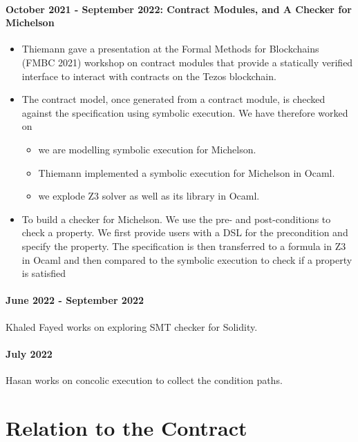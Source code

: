 \documentclass[a4paper,11pt]{article}
\begin{document}
\paragraph{October 2021 - September 2022: Contract Modules, and A Checker for Michelson}
\begin{itemize}
\item Thiemann gave a presentation at the Formal Methods for Blockchains (FMBC 2021) workshop on contract modules that provide a statically verified interface to interact with contracts on the Tezos blockchain.
\item The contract model, once generated from a contract module, is checked against the specification using symbolic execution. We have therefore worked on

\begin{itemize}
\item we are modelling symbolic execution for Michelson.
\item Thiemann implemented a symbolic execution for Michelson in Ocaml.
\item we explode Z3 solver as well as its library in Ocaml.
\end{itemize}

\item To build a checker for Michelson. We use the pre- and post-conditions to check a property. We first provide users with a DSL for the precondition and specify the property. The specification is then transferred to a formula in Z3 in Ocaml and then compared to the symbolic execution to check if a property is satisfied
\end{itemize}


\paragraph{June 2022 - September 2022} 

Khaled Fayed works on exploring SMT checker for Solidity.
\paragraph{July 2022}
Hasan works on concolic execution to collect the condition paths.




\section{Relation to the Contract}
\label{sec:relation-contract}
\end{document}
